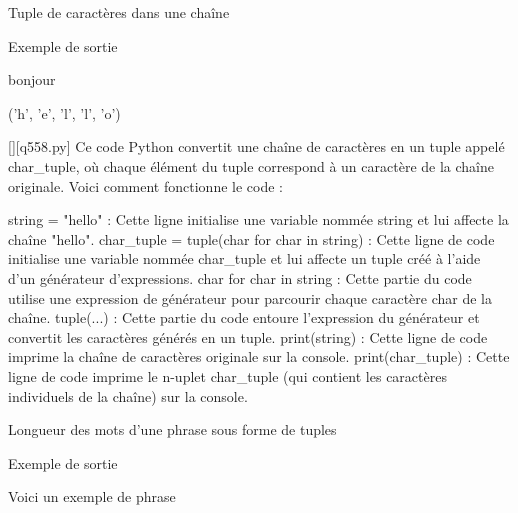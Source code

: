        \question
        Tuple de caractères dans une chaîne

Exemple de sortie

bonjour

('h', 'e', 'l', 'l', 'o')
        \par
        \begin{solution}
            \renewcommand{\nomfichier}{q558.py}
            \pythonfile{\chemincode \nomfichier}[][\nomfichier]
            Ce code Python convertit une chaîne de caractères en un tuple appelé char\_tuple, où chaque élément du tuple correspond à un caractère de la chaîne originale. Voici comment fonctionne le code :

    string = "hello" : Cette ligne initialise une variable nommée string et lui affecte la chaîne "hello".
    char\_tuple = tuple(char for char in string) : Cette ligne de code initialise une variable nommée char\_tuple et lui affecte un tuple créé à l'aide d'un générateur d'expressions.
        char for char in string : Cette partie du code utilise une expression de générateur pour parcourir chaque caractère char de la chaîne.
        tuple(...) : Cette partie du code entoure l'expression du générateur et convertit les caractères générés en un tuple.
    print(string) : Cette ligne de code imprime la chaîne de caractères originale sur la console.
    print(char\_tuple) : Cette ligne de code imprime le n-uplet char\_tuple (qui contient les caractères individuels de la chaîne) sur la console.
        \end{solution}
        

        \question
        Longueur des mots d'une phrase sous forme de tuples

Exemple de sortie

Voici un exemple de phrase

